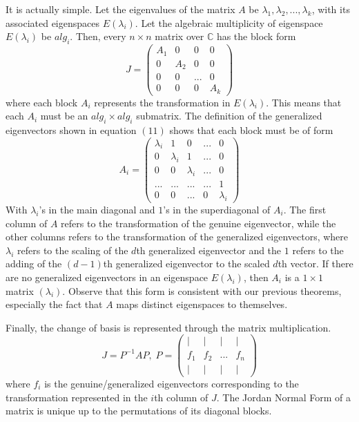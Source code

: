 \documentclass{article}
\theoremstyle{remark}
\theoremstyle{definition}
\begin{document}
It is actually simple. Let the eigenvalues of the matrix $A$ be $\lambda_1, \lambda_2, ..., \lambda_k$, with its associated eigenspaces $E(\lambda_i)$. Let the algebraic multiplicity of eigenspace $E(\lambda_i)$ be $alg_i$. Then, every $n \times n$ matrix over $\mathbb{C}$ has the block form 
\[ J = \begin{pmatrix}
A_1&0&0&0\\
0&A_2&0&0\\
0&0&...&0\\
0&0&0&A_k
\end{pmatrix}\]
where each block $A_i$ represents the transformation in $E(\lambda_i)$. This means that each $A_i$ must be an $alg_i \times alg_i$ submatrix. The definition of the generalized eigenvectors shown in equation $(11)$ shows that each block must be of form 
\[A_i = \begin{pmatrix}
\lambda_i & 1 & 0 & ... & 0\\
0 &\lambda_i & 1 &...&0 \\
0&0&\lambda_i&...&0\\
...&...&...&...&1\\
0&0&...&0&\lambda_i
\end{pmatrix}\]
With $\lambda_i$'s in the main diagonal and $1$'s in the superdiagonal of $A_i$. The first column of $A$ refers to the transformation of the genuine eigenvector, while the other columns refers to the transformation of the generalized eigenvectors, where $\lambda_i$ refers to the scaling of the $d$th generalized eigenvector and the $1$ refers to the adding of the $(d-1)$th generalized eigenvector to the scaled $d$th vector. If there are no generalized eigenvectors in an eigenspace $E(\lambda_i)$, then $A_i$ is a $1 \times 1$ matrix $( \lambda_i )$. Observe that this form is consistent with our previous theorems, especially the fact that $A$ maps distinct eigenspaces to themselves. 

Finally, the change of basis is represented through the matrix multiplication. 
\[J = P^{-1} A P, \; P = \begin{pmatrix}
|&|&|&| \\ 
f_1&f_2&...&f_n \\
|&|&|&|
\end{pmatrix} \]
where $f_i$ is the genuine/generalized eigenvectors corresponding to the transformation represented in the $i$th column of $J$. The Jordan Normal Form of a matrix is unique up to the permutations of its diagonal blocks. 
\end{document}
